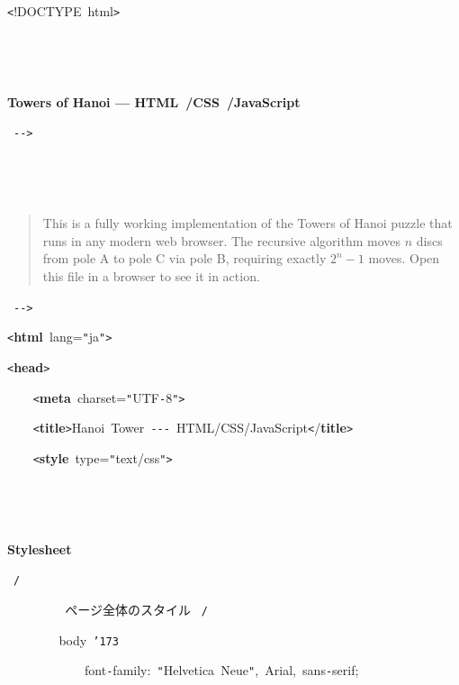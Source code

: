 \documentclass[a4paper,10pt]{article}
\def\mc{\relax}
\begin{document}
\tt\mc 

\noindent
\mbox{}{\tt <}!DOCTYPE{\tt\mc \ }html{\tt >}

\noindent
\mbox{}\rm\mc {\tt <}{\tt !}{\tt -}{\tt -}\  \parbox[t]{0.85\textwidth}{\ \centerline{\bf Towers of Hanoi --- HTML{\ /}CSS{\ /}JavaScript}} \rm\mc \ {\tt -}{\tt -}{\tt >}
\tt\mc 

\noindent
\mbox{}\rm\mc {\tt <}{\tt !}{\tt -}{\tt -}\ 
\tt\mc 

\noindent
\mbox{}\rm\mc \ \begin{quote}
\noindent
This is a fully working implementation of the Towers of Hanoi
puzzle that runs in any modern web browser.  The recursive algorithm
moves $n$ discs from pole A to pole C via pole B, requiring exactly
$2^n - 1$ moves.  Open this file in a browser to see it in action.
\end{quote} 
\tt\mc 

\noindent
\mbox{}\rm\mc \ {\tt -}{\tt -}{\tt >}
\tt\mc 

\noindent
\mbox{}{\tt <}\textbf{html}{\tt\mc \ }lang={\tt "}ja{\tt "}{\tt >}

\noindent
\mbox{}{\tt <}\textbf{head}{\tt >}

\noindent
\mbox{}{\tt\mc \ }{\tt\mc \ }{\tt\mc \ }{\tt\mc \ }{\tt <}\textbf{meta}{\tt\mc \ }charset={\tt "}UTF{\tt -}8{\tt "}{\tt >}

\noindent
\mbox{}{\tt\mc \ }{\tt\mc \ }{\tt\mc \ }{\tt\mc \ }{\tt <}\textbf{title}{\tt >}Hanoi{\tt\mc \ }Tower{\tt\mc \ }{\tt -}{\tt -}{\tt -}{\tt\mc \ }HTML/CSS/JavaScript{\tt <}/\textbf{title}{\tt >}

\noindent
\mbox{}{\tt\mc \ }{\tt\mc \ }{\tt\mc \ }{\tt\mc \ }{\tt <}\textbf{style}{\tt\mc \ }type={\tt "}text/css{\tt "}{\tt >}

\noindent
\mbox{}{\tt\mc \ }{\tt\mc \ }{\tt\mc \ }{\tt\mc \ }{\tt\mc \ }{\tt\mc \ }{\tt\mc \ }{\tt\mc \ }\rm\mc {\tt /}{\tt *}\  \parbox[t]{0.85\textwidth}{\ \centerline{\bf Stylesheet}} \rm\mc \ {\tt *}{\tt /}
\tt\mc 

\noindent
\mbox{}{\tt\mc \ }{\tt\mc \ }{\tt\mc \ }{\tt\mc \ }{\tt\mc \ }{\tt\mc \ }{\tt\mc \ }{\tt\mc \ }\rm\mc {\tt /}{\tt *}\  ページ全体のスタイル \rm\mc \ {\tt *}{\tt /}
\tt\mc 

\noindent
\mbox{}{\tt\mc \ }{\tt\mc \ }{\tt\mc \ }{\tt\mc \ }{\tt\mc \ }{\tt\mc \ }{\tt\mc \ }{\tt\mc \ }body{\tt\mc \ }{\tt\char'173}

\noindent
\mbox{}{\tt\mc \ }{\tt\mc \ }{\tt\mc \ }{\tt\mc \ }{\tt\mc \ }{\tt\mc \ }{\tt\mc \ }{\tt\mc \ }{\tt\mc \ }{\tt\mc \ }{\tt\mc \ }{\tt\mc \ }font{\tt -}family:{\tt\mc \ }{\tt "}Helvetica{\tt\mc \ }Neue{\tt "},{\tt\mc \ }Arial,{\tt\mc \ }sans{\tt -}serif;
\end{document}
